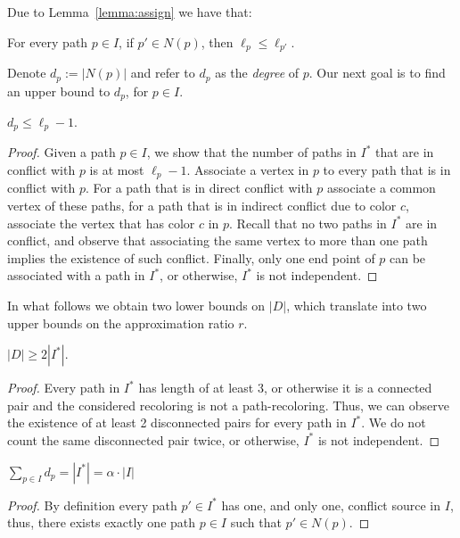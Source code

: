 Due to Lemma~\ref{lemma:assign} we have that:

\begin{observation}
\label{co:dpLeqDp'}
For every path $p \in I$, if $p' \in N(p)$, then $\ell_p \leq \ell_{p'}$.
\end{observation}

Denote $d_p := |N(p)|$ and refer to $d_p$ as the \emph{degree} of $p$.
Our next goal is to find an upper bound to $d_p$, for $p \in I$.

\begin{lemma}
\label{lm:num_in_conflict}
$d_p \leq \ell_p - 1$.
\end{lemma}
\begin{proof}
Given a path $p \in I$, we show that the number of paths in $I^*$ that
are in conflict with $p$ is at most $\ell_p - 1$.
%
Associate a vertex in $p$ to every path that is in conflict with $p$.
For a path that is in direct conflict with $p$ associate a common
vertex of these paths, for a path that is in indirect conflict due to
color $c$, associate the vertex that has color $c$ in $p$.  Recall
that no two paths in $I^*$ are in conflict, and observe that
associating the same vertex to more than one path implies the
existence of such conflict. 
Finally, only one end point of $p$ can be associated with a path in $I^*$, 
or otherwise, $I^*$ is not independent.
\end{proof}

In what follows we obtain two lower bounds on $|D|$, which translate
into two upper bounds on the approximation ratio $r$.

\begin{lemma}
\label{lemma:kernel}
$|D| \geq 2|I^*|$.
\end{lemma}
\begin{proof}
Every path in $I^*$ has length of at least 3, or otherwise it is a
connected pair and the considered recoloring is not a path-recoloring.
Thus, we can observe the existence of at least 2 disconnected pairs
for every path in $I^*$.  We do not count the same disconnected pair
twice, or otherwise, $I^*$ is not independent.
\end{proof}


\begin{observation}
\label{obs:sum}
$\sum_{p \in I}{d_p} = |I^*| = \alpha \cdot |I|$
\end{observation}
\begin{proof}
By definition every path $p' \in I^*$ has one, and only one, conflict
source in $I$, thus, 
there exists exactly one path $p \in I$ such that $p' \in N(p)$.
\end{proof}


